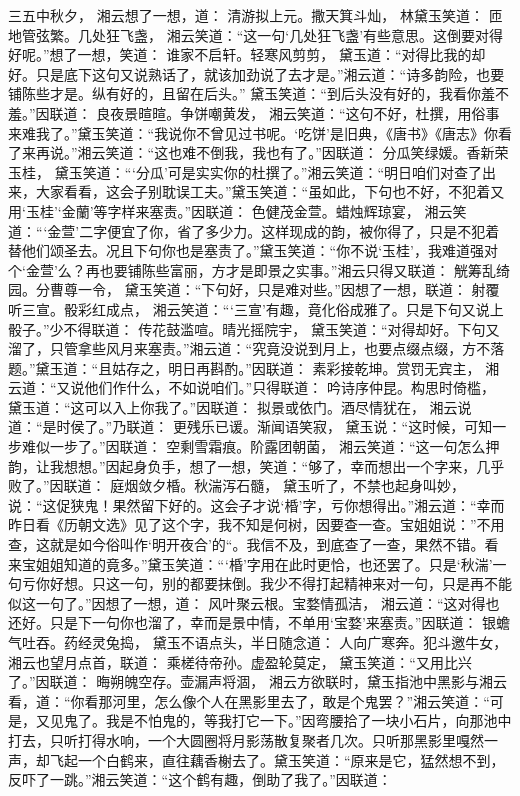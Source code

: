 \documentclass[12pt,oneside]{book}
\begin{document}
三五中秋夕，
湘云想了一想，道：
清游拟上元。撒天箕斗灿，
林黛玉笑道：
匝地管弦繁。几处狂飞盏，
湘云笑道：“这一句‘几处狂飞盏’有些意思。这倒要对得好呢。”想了一想，笑道：
谁家不启轩。轻寒风剪剪，
黛玉道：“对得比我的却好。只是底下这句又说熟话了，就该加劲说了去才是。”湘云道：“诗多韵险，也要铺陈些才是。纵有好的，且留在后头。”
黛玉笑道：“到后头没有好的，我看你羞不羞。”因联道：
良夜景暄暄。争饼嘲黄发，
湘云笑道：“这句不好，杜撰，用俗事来难我了。”黛玉笑道：“我说你不曾见过书呢。‘吃饼’是旧典，《唐书》《唐志》你看了来再说。”湘云笑道：“这也难不倒我，我也有了。”因联道：
分瓜笑绿媛。香新荣玉桂，
黛玉笑道：“‘分瓜’可是实实你的杜撰了。”湘云笑道：“明日咱们对查了出来，大家看看，这会子别耽误工夫。”黛玉笑道：“虽如此，下句也不好，不犯着又用‘玉桂’‘金蘭’等字样来塞责。”因联道：
色健茂金萱。蜡烛辉琼宴，
湘云笑道：“‘金萱’二字便宜了你，省了多少力。这样现成的韵，被你得了，只是不犯着替他们颂圣去。况且下句你也是塞责了。”黛玉笑道：“你不说‘玉桂’，我难道强对个‘金萱’么？再也要铺陈些富丽，方才是即景之实事。”湘云只得又联道：
觥筹乱绮园。分曹尊一令，
黛玉笑道：“下句好，只是难对些。”因想了一想，联道：
射覆听三宣。骰彩红成点，
湘云笑道：“‘三宣’有趣，竟化俗成雅了。只是下句又说上骰子。”少不得联道：
传花鼓滥喧。晴光摇院宇，
黛玉笑道：“对得却好。下句又溜了，只管拿些风月来塞责。”湘云道：“究竟没说到月上，也要点缀点缀，方不落题。”黛玉道：“且姑存之，明日再斟酌。”因联道：
素彩接乾坤。赏罚无宾主，
湘云道：“又说他们作什么，不如说咱们。”只得联道：
吟诗序仲昆。构思时倚槛，
黛玉道：“这可以入上你我了。”因联道：
拟景或依门。酒尽情犹在，
湘云说道：“是时侯了。”乃联道：
更残乐已谖。渐闻语笑寂，
黛玉说：“这时候，可知一步难似一步了。”因联道：
空剩雪霜痕。阶露团朝菌，
湘云笑道：“这一句怎么押韵，让我想想。”因起身负手，想了一想，笑道：“够了，幸而想出一个字来，几乎败了。”因联道：
庭烟敛夕棔。秋湍泻石髓，
黛玉听了，不禁也起身叫妙，说：“这促狭鬼！果然留下好的。这会子才说‘棔’字，亏你想得出。”湘云道：“幸而昨日看《历朝文选》见了这个字，我不知是何树，因要查一查。宝姐姐说：”不用查，这就是如今俗叫作‘明开夜合’的“。我信不及，到底查了一查，果然不错。看来宝姐姐知道的竟多。”黛玉笑道：“‘棔’字用在此时更恰，也还罢了。只是‘秋湍’一句亏你好想。只这一句，别的都要抹倒。我少不得打起精神来对一句，只是再不能似这一句了。”因想了一想，道：
风叶聚云根。宝婺情孤洁，
湘云道：“这对得也还好。只是下一句你也溜了，幸而是景中情，不单用‘宝婺’来塞责。”因联道：
银蟾气吐吞。药经灵兔捣，
黛玉不语点头，半日随念道：
人向广寒奔。犯斗邀牛女，
湘云也望月点首，联道：
乘槎待帝孙。虚盈轮莫定，
黛玉笑道：“又用比兴了。”因联道：
晦朔魄空存。壶漏声将涸，
湘云方欲联时，黛玉指池中黑影与湘云看，道：“你看那河里，怎么像个人在黑影里去了，敢是个鬼罢？”湘云笑道：“可是，又见鬼了。我是不怕鬼的，等我打它一下。”因弯腰拾了一块小石片，向那池中打去，只听打得水响，一个大圆圈将月影荡散复聚者几次。只听那黑影里嘎然一声，却飞起一个白鹤来，直往藕香榭去了。黛玉笑道：“原来是它，猛然想不到，反吓了一跳。”湘云笑道：“这个鹤有趣，倒助了我了。”因联道：
\end{document}
